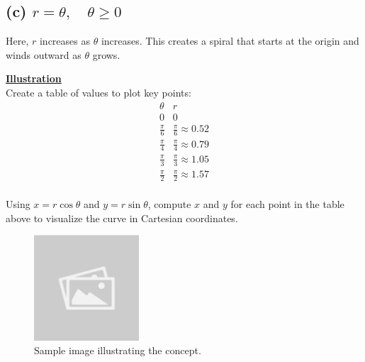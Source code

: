 \documentclass{article}
\begin{document}
\subsection*{(c) \( r = \theta, \quad \theta \geq 0 \)}
\begin{solutionbox}
Here, \( r \) increases as \( \theta \) increases. This creates a spiral that starts at the origin and winds outward as \( \theta \) grows. 

\begin{remarkbox}
    \textbf{\underline{Illustration}} \\
    Create a table of values to plot key points:
    \[
    \begin{array}{c|c}
    \theta & r \\
    \hline
    0 & 0 \\
    \frac{\pi}{6} & \frac{\pi}{6} \approx 0.52 \\
    \frac{\pi}{4} & \frac{\pi}{4} \approx 0.79 \\
    \frac{\pi}{3} & \frac{\pi}{3} \approx 1.05 \\
    \frac{\pi}{2} & \frac{\pi}{2} \approx 1.57 \\
    \end{array}
        \]
    \begin{notebox}
    Using \( x = r \cos\theta \) and \( y = r \sin\theta \), compute \( x \) and \( y \) for each point in the table above to visualize the curve in Cartesian coordinates.
    \end{notebox}
\end{remarkbox}
\begin{figure}[H]
    \centering
    \includegraphics[width=0.35\textwidth]{sample_image.jpg}
    \caption{Sample image illustrating the concept.}
    \label{fig:sample_image}
\end{figure}
\end{solutionbox}
\end{document}
